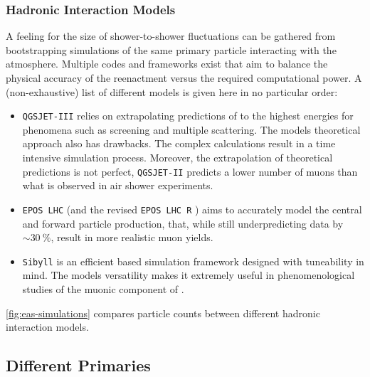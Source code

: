 \subsubsection{Hadronic Interaction Models}
\label{sssec:hadronic-interaction-models}

A feeling for the size of shower-to-shower fluctuations can be gathered from 
bootstrapping simulations of the same \CR primary particle interacting with the
atmosphere. Multiple codes and frameworks exist that aim to balance the 
physical accuracy of the reenactment versus the required computational power. A
(non-exhaustive) list of different models is given here in no particular order:

\begin{itemize}
\vspace{0.1cm}
\item \texttt{QGSJET-III} \cite{ostapchenkoMonteCarloTreatment2011} relies on 
extrapolating predictions of \QFTs to the highest energies for phenomena such 
as screening and multiple scattering. The models theoretical approach also has 
drawbacks. The complex calculations result in a time intensive simulation 
process. Moreover, the extrapolation of theoretical predictions is not perfect,
\texttt{QGSJET-II} predicts a lower number of muons than what is observed in 
air shower experiments.

\vspace{0.1cm}
\item \texttt{EPOS LHC} \cite{pierogEPOSLHCTest2015} (and the revised 
\texttt{EPOS LHC R} \cite{pierogEPOSLHCRGlobalApproach2025}) aims to accurately
model the central and forward particle production, that, while still 
underpredicting data by $\sim\SI{30}{\percent}$, result in more realistic muon 
yields. 

\vspace{0.1cm}
\item \texttt{Sibyll} \cite{riehnHadronicInteractionModel2017} is an efficient
\MC based simulation framework designed with tuneability in mind. The models
versatility makes it extremely useful in phenomenological studies of the muonic
component of \EASs.
\end{itemize}

\vspace{0.1cm}
\noindent\cref{fig:eas-simulations} compares \EAS particle counts between 
different hadronic interaction models. 

\subsection{Different Primaries}
\label{ssec:different-primaries}

